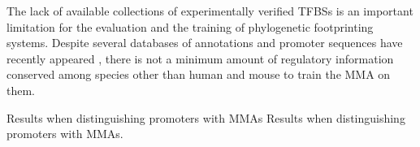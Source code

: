 The lack of available collections of experimentally verified TFBSs is
an important limitation for the evaluation and the training of phylogenetic 
footprinting systems. Despite several databases of annotations and promoter
sequences have recently appeared \citep{blanco:2006a,xuan:2005a}, there 
is not a minimum amount of regulatory information conserved among species 
other than human and mouse to train the MMA on them.

\begin{table}[t!]
\begin{center}
\begin{minipage}{0.95\linewidth}\setlength{\parindent}{0pt}
\begin{center}
\end{center}
\end{minipage}
          {Results when distinguishing promoters with MMAs}%
          {Results when distinguishing promoters with MMAs.}%
          {}
\end{center}
\end{table}

